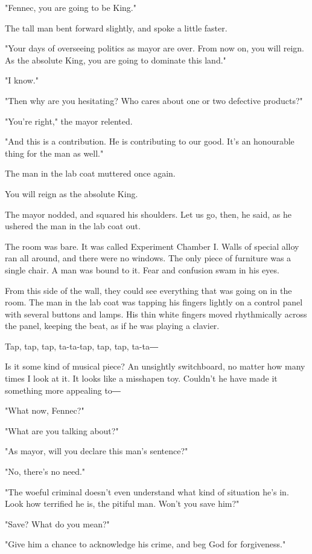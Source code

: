 "Fennec, you are going to be King."

The tall man bent forward slightly, and spoke a little faster.

"Your days of overseeing politics as mayor are over. From now on, you
will reign. As the absolute King, you are going to dominate this land."

"I know."

"Then why are you hesitating? Who cares about one or two defective
products?"

"You're right," the mayor relented.

"And this is a contribution. He is contributing to our good. It's an
honourable thing for the man as well."

The man in the lab coat muttered once again.

You will reign as the absolute King.

The mayor nodded, and squared his shoulders. Let us go, then, he said,
as he ushered the man in the lab coat out.

The room was bare. It was called Experiment Chamber I. Walls of special
alloy ran all around, and there were no windows. The only piece of
furniture was a single chair. A man was bound to it. Fear and confusion
swam in his eyes.

From this side of the wall, they could see everything that was going on
in the room. The man in the lab coat was tapping his fingers lightly on
a control panel with several buttons and lamps. His thin white fingers
moved rhythmically across the panel, keeping the beat, as if he was
playing a clavier.

Tap, tap, tap, ta-ta-tap, tap, tap, ta-ta―

Is it some kind of musical piece? An unsightly switchboard, no matter
how many times I look at it. It looks like a misshapen toy. Couldn't he
have made it something more appealing to―

"What now, Fennec?"

"What are you talking about?"

"As mayor, will you declare this man's sentence?"

"No, there's no need."

"The woeful criminal doesn't even understand what kind of situation he's
in. Look how terrified he is, the pitiful man. Won't you save him?"

"Save? What do you mean?"

"Give him a chance to acknowledge his crime, and beg God for
forgiveness."

